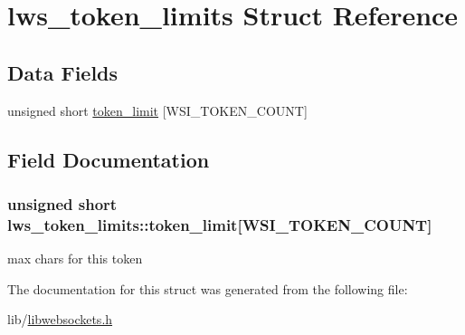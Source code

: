 \hypertarget{structlws__token__limits}{}\section{lws\+\_\+token\+\_\+limits Struct Reference}
\label{structlws__token__limits}
\subsection*{Data Fields}
\begin{DoxyCompactItemize}
\item 
unsigned short \hyperlink{structlws__token__limits_a6ec712306cbf8585bce7a56758a3ceff}{token\+\_\+limit} \mbox{[}W\+S\+I\+\_\+\+T\+O\+K\+E\+N\+\_\+\+C\+O\+U\+NT\mbox{]}
\end{DoxyCompactItemize}


\subsection{Field Documentation}
\subsubsection[{\texorpdfstring{token\+\_\+limit}{token\_limit}}]{\setlength{\rightskip}{0pt plus 5cm}unsigned short lws\+\_\+token\+\_\+limits\+::token\+\_\+limit\mbox{[}W\+S\+I\+\_\+\+T\+O\+K\+E\+N\+\_\+\+C\+O\+U\+NT\mbox{]}}\hypertarget{structlws__token__limits_a6ec712306cbf8585bce7a56758a3ceff}{}\label{structlws__token__limits_a6ec712306cbf8585bce7a56758a3ceff}
max chars for this token 

The documentation for this struct was generated from the following file\+:\begin{DoxyCompactItemize}
\item 
lib/\hyperlink{libwebsockets_8h}{libwebsockets.\+h}\end{DoxyCompactItemize}
